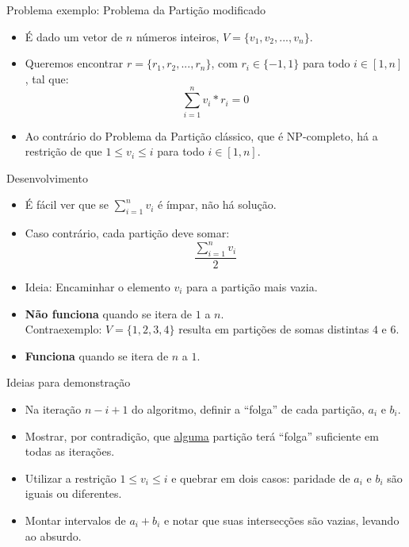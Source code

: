 \documentclass[final,hyperref={pdfpagelabels=false}]{beamer}
\begin{document}
\begin{frame}[t]
\begin{columns}[t]
\begin{column}{.465\textwidth}
\begin{block}{Problema exemplo: Problema da Partição modificado}
\begin{itemize}
\item É dado um vetor de $n$ números inteiros, $V = \{v_1, v_2, ..., v_n\}$.
\item Queremos encontrar $r = \{r_1, r_2, ..., r_n\}$, com $r_i \in \{-1, 1\}$ para todo $i \in [1, n]$, tal que:
$$\sum_{i = 1}^n v_i*r_i = 0$$
\item Ao contrário do Problema da Partição clássico, que é NP-completo, há a restrição de que $1 \leq v_i \leq i$ para todo $i \in [1, n].$
\end{itemize}

\end{block}


\begin{block}{Desenvolvimento}

\begin{itemize}

\item É fácil ver que se $\sum_{i = 1}^n v_i$ é ímpar, não há solução.
\item Caso contrário, cada partição deve somar:
$$\frac{\sum_{i = 1}^n v_i}{2}$$
\item Ideia: Encaminhar o elemento $v_i$ para a partição mais vazia.
\item \textbf{Não funciona} quando se itera de $1$ a $n$.\\
Contraexemplo: $V = \{1, 2, 3, 4\}$ resulta em partições de somas distintas $4$ e $6$.
\item \textbf{Funciona} quando se itera de $n$ a $1$.
\end{itemize}

\end{block}


\begin{block}{Ideias para demonstração}

\begin{itemize}
\item Na iteração $n - i + 1$ do algoritmo, definir a ``folga'' de cada partição, $a_i$ e $b_i$.
\item Mostrar, por contradição, que \underline{alguma} partição terá ``folga'' suficiente em todas as iterações.
\item Utilizar a restrição $1 \leq v_i \leq i$ e quebrar em dois casos: paridade de $a_i$ e $b_i$ são iguais ou diferentes.
\item Montar intervalos de $a_i + b_i$ e notar que suas intersecções são vazias, levando ao absurdo.


\end{itemize}
\end{block}
\end{column}
\end{columns}
\end{frame}
\end{document}
